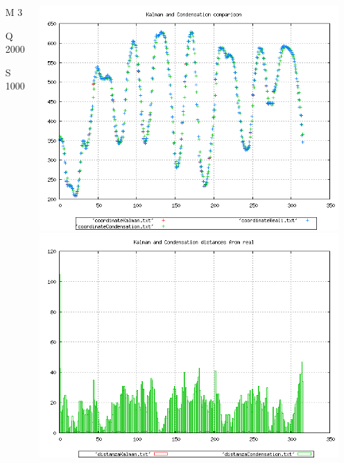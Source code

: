 {\begin{columns}
\begin{scriptsize}
\begin{itemize}
\item [M]3
\item [Q]2000
\item [S]1000
\end{itemize}
\end{scriptsize}
\includegraphics[scale=0.1]{../esperimenti/movie12/mod_3-Q_2000-S_1000/plot.png}\\
\includegraphics[scale=0.1]{../esperimenti/movie12/mod_3-Q_2000-S_1000/plot-distances.png}


\end{columns}}
